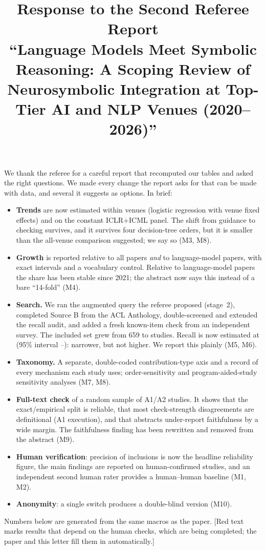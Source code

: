 \documentclass[10pt,a4paper]{article}
\title{Response to the Second Referee Report\\[2pt]\large ``Language Models Meet Symbolic Reasoning: A Scoping Review of Neurosymbolic Integration at Top-Tier AI and NLP Venues (2020--2026)''}
\author{}
\date{}
\newcommand{\pending}[1]{\textcolor{red!70!black}{[#1]}}
\begin{document}
\maketitle

We thank the referee for a careful report that recomputed our tables and asked the right questions. We made every change the report asks for that can be made with data, and several it suggests as options. In brief:
\begin{itemize}
  \item \textbf{Trends} are now estimated within venues (logistic regression with venue fixed effects) and on the constant ICLR+ICML panel. The shift from guidance to checking survives, and it survives four decision-tree orders, but it is smaller than the all-venue comparison suggested; we say so (M3, M8).
  \item \textbf{Growth} is reported relative to all papers \emph{and} to language-model papers, with exact intervals and a vocabulary control. Relative to language-model papers the share has been stable since 2021; the abstract now says this instead of a bare ``14-fold'' (M4).
  \item \textbf{Search.} We ran the augmented query the referee proposed (stage~2), completed Source B from the ACL Anthology, double-screened and extended the recall audit, and added a fresh known-item check from an independent survey. The included set grew from 659 to  studies. Recall is now estimated at  (95\% interval --): narrower, but not higher. We report this plainly (M5, M6).
  \item \textbf{Taxonomy.} A separate, double-coded contribution-type axis and a record of every mechanism each study uses; order-sensitivity and program-aided-study sensitivity analyses (M7, M8).
  \item \textbf{Full-text check} of a random sample of A1/A2 studies. It shows that the exact/empirical split is reliable, that most check-strength disagreements are definitional (A1 execution), and that abstracts under-report faithfulness by a wide margin. The faithfulness finding has been rewritten and removed from the abstract (M9).
  \item \textbf{Human verification}: precision of inclusions is now the headline reliability figure, the main findings are reported on human-confirmed studies, and an independent second human rater provides a human--human baseline (M1, M2).
  \item \textbf{Anonymity}: a single switch produces a double-blind version (M10).
\end{itemize}
Numbers below are generated from the same macros as the paper.
\ifhumancheck\else
\pending{Red text marks results that depend on the human checks, which are being completed; the paper and this letter fill them in automatically.}
\fi
\end{document}
